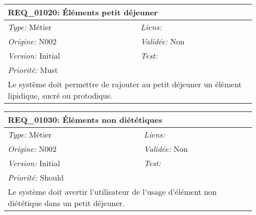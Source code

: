 \begin{table}[!h]

\begin{tabular}{|p{60mm}p{100mm}|}

\hline

\multicolumn{2}{|l|}{\textbf{REQ\_01020:} Éléments petit déjeuner} \\ \hline

\emph{Type:} Métier & \emph{Liens:}  \\

\emph{Origine:} N002 & \emph{Validée:} Non \\

\emph{Version:} Initial & \emph{Test:}  \\

\emph{Priorité:} Must & \\ \hline

\multicolumn{2}{|p{16cm}|}{Le système doit permettre de rajouter au petit déjeuner un élément lipidique, sucré ou protodique.} \\ \hline

\end{tabular}

\end{table}



\begin{table}[!h]

\begin{tabular}{|p{60mm}p{100mm}|}

\hline

\multicolumn{2}{|l|}{\textbf{REQ\_01030:} Éléments non diététiques} \\ \hline

\emph{Type:} Métier & \emph{Liens:}  \\

\emph{Origine:} N002 & \emph{Validée:} Non \\

\emph{Version:} Initial & \emph{Test:}  \\

\emph{Priorité:} Should & \\ \hline

\multicolumn{2}{|p{16cm}|}{Le système doit avertir l'utilisateur de l'usage d'élément non diététique dans un petit déjeuner.} \\ \hline

\end{tabular}

\end{table}



